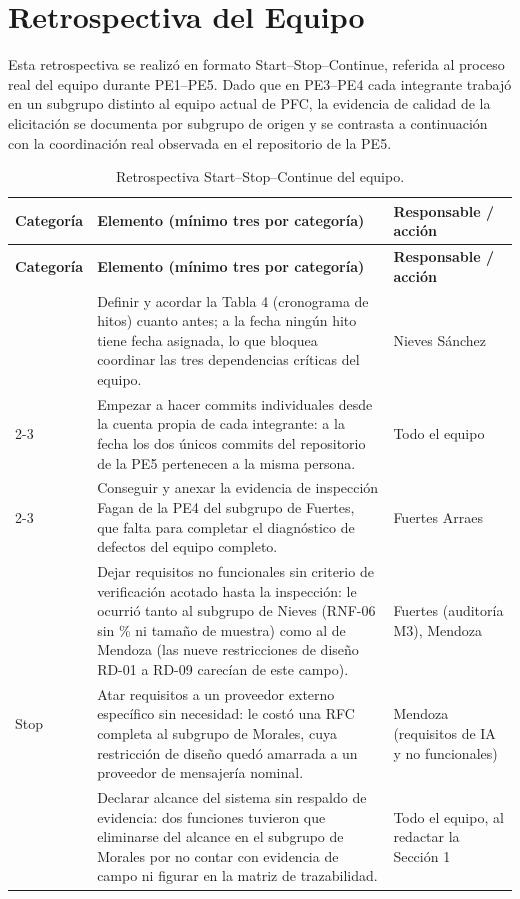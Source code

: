 \documentclass[journal,onecolumn]{IEEEtran}
\begin{document}
	\section{Retrospectiva del Equipo}
	
Esta retrospectiva se realizó en formato Start--Stop--Continue, referida al
proceso real del equipo durante PE1--PE5. Dado que en PE3--PE4 cada
integrante trabajó en un subgrupo distinto al equipo actual de PFC, la
evidencia de calidad de la elicitación se documenta por subgrupo de origen
y se contrasta a continuación con la coordinación real observada en el
repositorio de la PE5.

\begin{longtable}{|p{2.2cm}|p{7.3cm}|p{4.3cm}|}
	\caption{Retrospectiva Start--Stop--Continue del equipo.} \label{tab:retrospectiva} \\
	\hline
	\textbf{Categoría} & \textbf{Elemento (mínimo tres por categoría)} & \textbf{Responsable / acción} \\
	\hline
	\endfirsthead
	\hline
	\textbf{Categoría} & \textbf{Elemento (mínimo tres por categoría)} & \textbf{Responsable / acción} \\
	\hline
	\endhead
	\hline
	\endfoot
	\hline
	\endlastfoot
	
	\multirow{3}{*}{Start}
	& Definir y acordar la Tabla 4 (cronograma de hitos) cuanto antes; a la fecha ningún hito tiene fecha asignada, lo que bloquea coordinar las tres dependencias críticas del equipo. & Nieves Sánchez \\
	\cline{2-3}
	& Empezar a hacer commits individuales desde la cuenta propia de cada integrante: a la fecha los dos únicos commits del repositorio de la PE5 pertenecen a la misma persona. & Todo el equipo \\
	\cline{2-3}
	& Conseguir y anexar la evidencia de inspección Fagan de la PE4 del subgrupo de Fuertes, que falta para completar el diagnóstico de defectos del equipo completo. & Fuertes Arraes \\
	\hline
	
	\multirow{3}{*}{Stop}
	& Dejar requisitos no funcionales sin criterio de verificación acotado hasta la inspección: le ocurrió tanto al subgrupo de Nieves (RNF-06 sin \% ni tamaño de muestra) como al de Mendoza (las nueve restricciones de diseño RD-01 a RD-09 carecían de este campo). & Fuertes (auditoría M3), Mendoza \\
	\cline{2-3}
	& Atar requisitos a un proveedor externo específico sin necesidad: le costó una RFC completa al subgrupo de Morales, cuya restricción de diseño quedó amarrada a un proveedor de mensajería nominal. & Mendoza (requisitos de IA y no funcionales) \\
	\cline{2-3}
	& Declarar alcance del sistema sin respaldo de evidencia: dos funciones tuvieron que eliminarse del alcance en el subgrupo de Morales por no contar con evidencia de campo ni figurar en la matriz de trazabilidad. & Todo el equipo, al redactar la Sección 1 \\
	\hline
	

\end{longtable}
\end{document}
